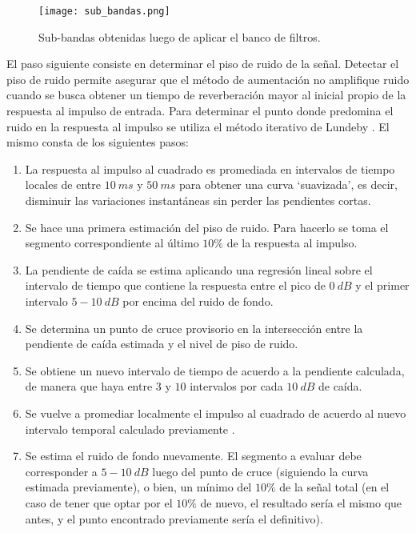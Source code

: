 \begin{figure}[H]
	\centering{}
	\texttt{[image: sub\_bandas.png]}
	\caption{Sub-bandas obtenidas luego de aplicar el banco de filtros.}
	\label{fig:sub_bandas}
\end{figure}

El paso siguiente consiste en determinar el piso de ruido de la señal. Detectar el piso de ruido permite asegurar que el método de aumentación no amplifique ruido cuando se busca obtener un tiempo de reverberación mayor al inicial propio de la respuesta al impulso de entrada. Para determinar el punto donde predomina el ruido en la respuesta al impulso se utiliza el método iterativo de Lundeby \cite{Lundeby}. El mismo consta de los siguientes pasos: 

\begin{enumerate}
\item La respuesta al impulso al cuadrado es promediada en intervalos de tiempo locales de entre $10 \ ms$ y $50 \ ms$ para obtener una curva `suavizada', es decir, disminuir las variaciones instantáneas sin perder las pendientes cortas.

\item Se hace una primera estimación del piso de ruido. Para hacerlo se toma el segmento correspondiente al último $10\%$ de la respuesta al impulso.

\item La pendiente de caída se estima aplicando una regresión lineal sobre el intervalo de tiempo que contiene la respuesta entre el pico de $0 \ dB$ y el primer intervalo $5-10 \ dB$ por encima del ruido de fondo.

\item Se determina un punto de cruce provisorio en la intersección entre la pendiente de caída estimada y el nivel de piso de ruido.

\item Se obtiene un nuevo intervalo de tiempo de acuerdo a la pendiente calculada, de manera que haya entre $3$ y $10$ intervalos por cada $10 \ dB$ de caída.

\item Se vuelve a promediar localmente el impulso al cuadrado de acuerdo al nuevo intervalo temporal calculado previamente .

\item Se estima el ruido de fondo nuevamente. El segmento a evaluar debe corresponder a $5-10 \ dB$ luego del punto de cruce (siguiendo la curva estimada previamente), o bien, un mínimo del $10\%$ de la señal total (en el caso de tener que optar por el $10\%$ de nuevo, el resultado sería el mismo que antes, y el punto encontrado previamente sería el definitivo).


\end{enumerate}
